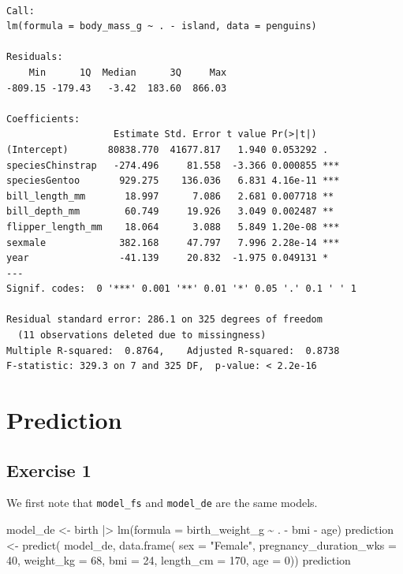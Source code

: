 \documentclass[
  letterpaper,
  DIV=11,
  numbers=noendperiod]{scrreprt}
\newenvironment{Shaded}{\begin{snugshade}}{\end{snugshade}}
\newcommand{\AttributeTok}[1]{\textcolor[rgb]{0.40,0.45,0.13}{#1}}
\newcommand{\DecValTok}[1]{\textcolor[rgb]{0.68,0.00,0.00}{#1}}
\newcommand{\FunctionTok}[1]{\textcolor[rgb]{0.28,0.35,0.67}{#1}}
\newcommand{\NormalTok}[1]{\textcolor[rgb]{0.00,0.23,0.31}{#1}}
\newcommand{\OtherTok}[1]{\textcolor[rgb]{0.00,0.23,0.31}{#1}}
\newcommand{\SpecialCharTok}[1]{\textcolor[rgb]{0.37,0.37,0.37}{#1}}
\newcommand{\StringTok}[1]{\textcolor[rgb]{0.13,0.47,0.30}{#1}}
\begin{document}
\begin{verbatim}

Call:
lm(formula = body_mass_g ~ . - island, data = penguins)

Residuals:
    Min      1Q  Median      3Q     Max 
-809.15 -179.43   -3.42  183.60  866.03 

Coefficients:
                   Estimate Std. Error t value Pr(>|t|)    
(Intercept)       80838.770  41677.817   1.940 0.053292 .  
speciesChinstrap   -274.496     81.558  -3.366 0.000855 ***
speciesGentoo       929.275    136.036   6.831 4.16e-11 ***
bill_length_mm       18.997      7.086   2.681 0.007718 ** 
bill_depth_mm        60.749     19.926   3.049 0.002487 ** 
flipper_length_mm    18.064      3.088   5.849 1.20e-08 ***
sexmale             382.168     47.797   7.996 2.28e-14 ***
year                -41.139     20.832  -1.975 0.049131 *  
---
Signif. codes:  0 '***' 0.001 '**' 0.01 '*' 0.05 '.' 0.1 ' ' 1

Residual standard error: 286.1 on 325 degrees of freedom
  (11 observations deleted due to missingness)
Multiple R-squared:  0.8764,    Adjusted R-squared:  0.8738 
F-statistic: 329.3 on 7 and 325 DF,  p-value: < 2.2e-16
\end{verbatim}

\section{Prediction}\label{prediction-3}

\subsection{Exercise 1}\label{exercise-1-30}

We first note that \texttt{model\_fs} and \texttt{model\_de} are the
same models.

\begin{Shaded}
\begin{Highlighting}[]
\NormalTok{model\_de }\OtherTok{\textless{}{-}}\NormalTok{ birth }\SpecialCharTok{|\textgreater{}} 
  \FunctionTok{lm}\NormalTok{(}\AttributeTok{formula =}\NormalTok{ birth\_weight\_g }\SpecialCharTok{\textasciitilde{}}\NormalTok{ . }\SpecialCharTok{{-}}\NormalTok{ bmi }\SpecialCharTok{{-}}\NormalTok{ age)}
\NormalTok{prediction }\OtherTok{\textless{}{-}} \FunctionTok{predict}\NormalTok{(}
\NormalTok{  model\_de, }
  \FunctionTok{data.frame}\NormalTok{(}
    \AttributeTok{sex =} \StringTok{"Female"}\NormalTok{, }
    \AttributeTok{pregnancy\_duration\_wks =} \DecValTok{40}\NormalTok{, }
    \AttributeTok{weight\_kg =} \DecValTok{68}\NormalTok{, }
    \AttributeTok{bmi =} \DecValTok{24}\NormalTok{, }
    \AttributeTok{length\_cm =} \DecValTok{170}\NormalTok{, }
    \AttributeTok{age =} \DecValTok{0}\NormalTok{))}
\NormalTok{prediction}
\end{Highlighting}
\end{Shaded}
\end{document}
